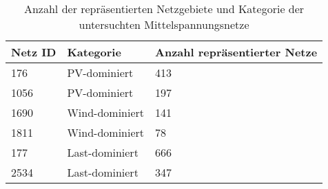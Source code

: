 {
\renewcommand{\arraystretch}{1.2}%
\begin{table}[H]
	\begin{center}
		\caption{Anzahl der repräsentierten Netzgebiete und Kategorie der untersuchten Mittelspannungsnetze}
		\begin{tabu} to \textwidth {X[1] X[1] X[1, r] }
			\hline
			Netz ID    & Kategorie      & Anzahl repräsentierter Netze \\ \hline
			\num{176}  & PV-dominiert   & \num{413}                    \\
			\num{1056} & PV-dominiert   & \num{197}                    \\
			\num{1690} & Wind-dominiert & \num{141}                    \\
			\num{1811} & Wind-dominiert & \num{78}                     \\
			\num{177}  & Last-dominiert & \num{666}                    \\
			\num{2534} & Last-dominiert & \num{347}                    \\ \hline
		\end{tabu}
		\label{tab:grid_IDs}
	\end{center}
	\vspace{-3mm}%
\end{table}
}